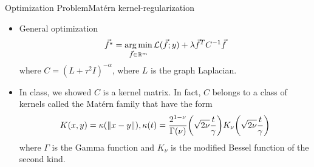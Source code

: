 	\begin{frame}{Optimization Problem}{Matérn kernel-regularization}
		\begin{itemize}
			\item General optimization
			\[\vec{f^*} = \operatorname*{arg\,min}_{\vec{f} \in \mathbb{R}^{m}} \mathcal{L}(\vec{f};y) + \lambda \vec{f}^{T}C^{-1}\vec{f}\]
			where $C = (L + \tau^2 I)^{-\alpha}$, where $L$ is the graph Laplacian.
			\item In class, we showed $C$ is a kernel matrix. In fact, $C$ belongs to a class of kernels called the Matérn family that have the form
			\[
				K(x,y) = \kappa({\left\|x-y\right\|}), \kappa(t) = \frac{2^{1-\nu}}{\Gamma(\nu)}{\left(\sqrt{2\nu}\frac{t}{\gamma}\right)}K_{\nu}{\left(\sqrt{2\nu}\frac{t}{\gamma}\right)}	
			\]
			where $\Gamma$ is the Gamma function and $K_\nu$ is the modified Bessel function of the second kind.
		\end{itemize}
	\end{frame}
